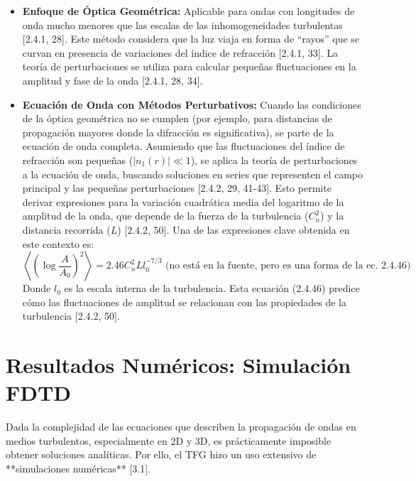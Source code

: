 \begin{itemize}[noitemsep,topsep=0pt] 
    \item \textbf{Enfoque de Óptica Geométrica:} Aplicable para ondas con longitudes de onda mucho menores que las escalas de las inhomogeneidades turbulentas [2.4.1, 28]. Este método considera que la luz viaja en forma de ``rayos'' que se curvan en presencia de variaciones del índice de refracción [2.4.1, 33]. La teoría de perturbaciones se utiliza para calcular pequeñas fluctuaciones en la amplitud y fase de la onda [2.4.1, 28, 34]. 
    \item \textbf{Ecuación de Onda con Métodos Perturbativos:} Cuando las condiciones de la óptica geométrica no se cumplen (por ejemplo, para distancias de propagación mayores donde la difracción es significativa), se parte de la ecuación de onda completa. Asumiendo que las fluctuaciones del índice de refracción son pequeñas ($|n_1(r)| \ll 1$), se aplica la teoría de perturbaciones a la ecuación de onda, buscando soluciones en series que representen el campo principal y las pequeñas perturbaciones [2.4.2, 29, 41-43]. Esto permite derivar expresiones para la variación cuadrática media del logaritmo de la amplitud de la onda, que depende de la fuerza de la turbulencia ($C_n^2$) y la distancia recorrida ($L$) [2.4.2, 50]. Una de las expresiones clave obtenida en este contexto es: $$ \left\langle \left(\log \frac{A}{A_0}\right)^2 \right\rangle = 2.46C_n^2L l_0^{-7/3} \text{ (no está en la fuente, pero es una forma de la ec. 2.4.46)} $$ Donde $l_0$ es la escala interna de la turbulencia. Esta ecuación (2.4.46) predice cómo las fluctuaciones de amplitud se relacionan con las propiedades de la turbulencia [2.4.2, 50]. 
\end{itemize} 

\section{Resultados Numéricos: Simulación FDTD} Dada la complejidad de las ecuaciones que describen la propagación de ondas en medios turbulentos, especialmente en 2D y 3D, es prácticamente imposible obtener soluciones analíticas. Por ello, el TFG hizo un uso extensivo de **simulaciones numéricas** [3.1]. 

